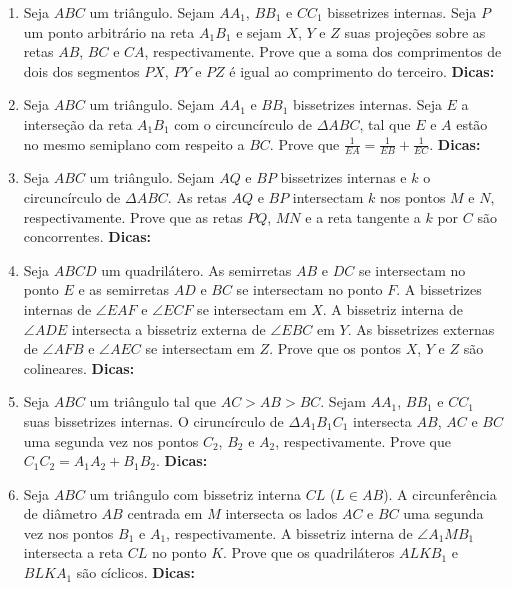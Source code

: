 \documentclass{article}
\newcommand{\dica}{\textbf{Dicas:}}
\newcommand{\iniTri}{Seja $ABC$ um triângulo}
\begin{document}
\begin{multicols}{2}
\begin{enumerate}
    \item \iniTri. Sejam $AA_1$, $BB_1$ e $CC_1$ bissetrizes internas. Seja $P$ um ponto arbitrário na reta $A_1B_1$ e sejam $X$, $Y$ e $Z$ suas projeções sobre as retas $AB$, $BC$ e $CA$, respectivamente. Prove que a soma dos comprimentos de dois dos segmentos $PX$, $PY$ e $PZ$ é igual ao comprimento do terceiro. \dica %
    
    \item \iniTri. Sejam $AA_1$ e $BB_1$ bissetrizes internas. Seja $E$ a interseção da reta $A_1B_1$ com o circuncírculo de $\Delta ABC$, tal que $E$ e $A$ estão no mesmo semiplano com respeito a $BC$. Prove que $\frac{1}{EA}=\frac{1}{EB}+\frac{1}{EC}$. \dica %
    
    \item \iniTri. Sejam $AQ$ e $BP$ bissetrizes internas e $k$ o circuncírculo de $\Delta ABC$. As retas $AQ$ e $BP$ intersectam $k$ nos pontos $M$ e $N$, respectivamente. Prove que as retas $PQ$, $MN$ e a reta tangente a $k$ por $C$ são concorrentes. \dica %
    
    \item Seja $ABCD$ um quadrilátero. As semirretas $AB$ e $DC$ se intersectam no ponto $E$ e as semirretas $AD$ e $BC$ se intersectam no ponto $F$. A bissetrizes internas de $\angle EAF$ e $\angle ECF$ se intersectam em $X$. A bissetriz interna de $\angle ADE$ intersecta a bissetriz externa de $\angle EBC$ em $Y$. As bissetrizes externas de $\angle AFB$ e $\angle AEC$ se intersectam em $Z$. Prove que os pontos $X$, $Y$ e $Z$ são colineares. \dica %
    
    \item Seja $ABC$ um triângulo tal que $AC>AB>BC$. Sejam $AA_1$, $BB_1$ e $CC_1$ suas bissetrizes internas. O ciruncírculo de $\Delta A_1B_1C_1$ intersecta $AB$, $AC$ e $BC$ uma segunda vez nos pontos $C_2$, $B_2$ e $A_2$, respectivamente. Prove que $C_1C_2=A_1A_2+B_1B_2$. \dica %
    
    \item Seja $ABC$ um triângulo com bissetriz interna $CL$ ($L\in AB$). A circunferência de diâmetro $AB$ centrada em $M$ intersecta os lados $AC$ e $BC$ uma segunda vez nos pontos $B_1$ e $A_1$, respectivamente. A bissetriz interna de $\angle A_1MB_1$ intersecta a reta $CL$ no ponto $K$. Prove que os quadriláteros $ALKB_1$ e $BLKA_1$ são cíclicos. \dica %
    

\end{enumerate}
\end{multicols}
\end{document}
